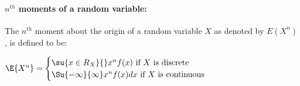 \paragraph{$n^{th}$ moments of a random variable:}
The $n^{th}$ moment about the origin of a random variable $X$ as denoted by
$E\left( X^{n} \right)$, is defined to be:
\begin{center}
	$\E{X^{n}}=
	\begin{cases}
		\su{x\in R_{X}}{{}}x^{n}f(x)\text{ if }X\text{ is discrete}\\
		\Su{-\infty}{\infty}x^{n}f(x)dx\text{ if }X\text{ is continuous}
	\end{cases}$
\end{center}
